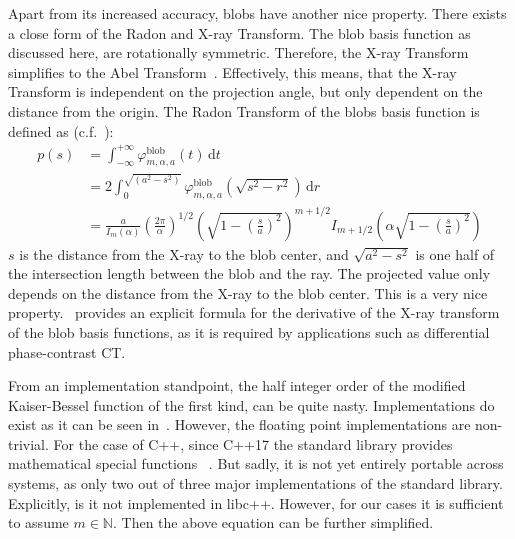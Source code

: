 Apart from its increased accuracy, blobs have another nice property. There exists a close form of
the Radon and X-ray Transform. The blob basis function as discussed here, are rotationally
symmetric. Therefore, the X-ray Transform simplifies to the Abel
Transform~\cite{buzug_computed_2008}. Effectively, this means, that the X-ray Transform is
independent on the projection angle, but only dependent on the distance from the origin. The Radon
Transform of the blobs basis function is defined as
(c.f.~\cite{lewitt_multidimensional_1990,lewitt_alternatives_1992}):
\begin{align}\label{eq:radon_blob_basis}
	p(s) & = \int_{-\infty}^{+\infty} \varphi^{\text{blob}}_{m, \alpha, a}\left(t\right) \, \mathrm{d} t                                                                                                       \\
	     & = 2 \int_0^{\sqrt{(a^2-s^2)}} \varphi^{\text{blob}}_{m, \alpha, a}\left(\sqrt{s^2 - r^2}\right) \, \mathrm{d} r                                                                                     \\
	     & = \frac{a}{I_m(\alpha)} \left( \frac{2\pi}{\alpha}\right)^{1/2} \left( \sqrt{1 - \left(\frac{s}{a}\right)^2} \right)^{m + 1/2} I_{m+1/2}\left( \alpha \sqrt{1 - \left(\frac{s}{a}\right)^2} \right)
\end{align}
\(s\) is the distance from the X-ray to the blob center, and \(\sqrt{a^2 - s^2}\) is one half of the
intersection length between the blob and the ray. The projected value only depends on the distance
from the X-ray to the blob center. This is a very nice property.~\cite{xu_investigation_2012}
provides an explicit formula for the derivative of the X-ray transform of the blob basis functions,
as it is required by applications such as differential phase-contrast CT\@.

From an implementation standpoint, the half integer order of the modified Kaiser-Bessel function of
the first kind, can be quite nasty. Implementations do exist as it can be seen
in~\cite{temme_numerical_1975}. However, the floating point implementations are non-trivial. For the
case of C++, since C++17 the standard library provides mathematical special functions
~\cite{noauthor_c_nodate, noauthor_stdcyl_bessel_i_nodate}. But sadly, it is not yet entirely
portable across systems, as only two out of three major implementations of the standard library.
Explicitly, is it not implemented in libc++. However, for our cases it is sufficient to assume \(m
\in \mathbb{N}\). Then the above equation can be further simplified.

